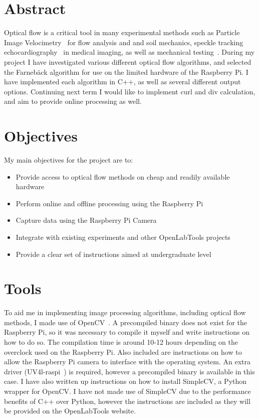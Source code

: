 \documentclass[a4paper,10pt]{article}
\begin{document}
  
  \tableofcontents
  
  \newpage
  \setcounter{page}{1}
  
  \section{Abstract}
  
  Optical flow is a critical tool in many experimental methods such as Particle Image Velocimetry~\cite{quenot1998particle} for flow analysis and and soil mechanics, speckle tracking echocardiography~\cite{speckle} in medical imaging, as well as mechanical testing~\cite{harris2012characterizing}. During my project I have investigated various different optical flow algorithms, and selected the Farnebäck algorithm for use on the limited hardware of the Raspberry Pi. I have implemented each algorithm in C++, as well as several different output options. Continuing next term I would like to implement curl and div calculation, and aim to provide online processing as well.
  
  
  \section{Objectives}
    My main objectives for the project are to:
    \begin{itemize}
      \item Provide access to optical flow methods on cheap and readily available hardware
      \item Perform online and offline processing using the Raspberry Pi
      \item Capture data using the Raspberry Pi Camera
      \item Integrate with existing experiments and other OpenLabTools projects
      \item Provide a clear set of instructions aimed at undergraduate level
    \end{itemize}
    
  \section{Tools}
    To aid me in implementing image processing algorithms, including optical flow methods, I made use of OpenCV~\cite{opencv}. A precompiled binary does not exist for the Raspberry Pi, so it was necessary to compile it myself and write instructions on how to do so. The compilation time is around 10-12 hours depending on the overclock used on the Raspberry Pi. Also included are instructions on how to allow the Raspberry Pi camera to interface with the operating system. An extra driver (UV4l-raspi~\cite{uv4l}) is required, however a precompiled binary is available in this case. I have also written up instructions on how to install SimpleCV, a Python wrapper for OpenCV. I have not made use of SimpleCV due to the performance benefits of C++ over Python, however the instructions are included as they will be provided on the OpenLabTools website.
    
\end{document}
